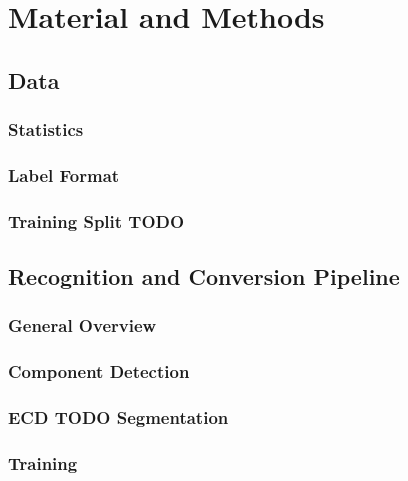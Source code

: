 \chapter{Material and Methods}

\section{Data}

\subsection{Statistics}

\subsection{Label Format}

\subsection{Training Split TODO}

\section{Recognition and Conversion Pipeline}

\subsection{General Overview}

\subsection{Component Detection}

\subsection{ECD TODO Segmentation}

\subsection{Training}
